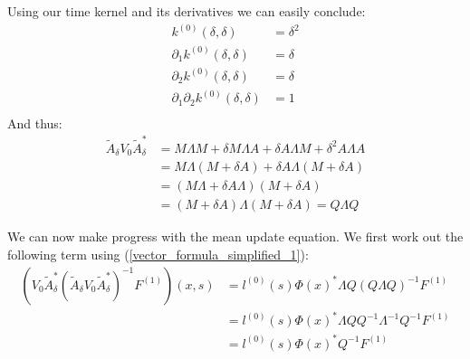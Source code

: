 \documentclass{article}
\theoremstyle{definition}
\theoremstyle{remark}
\theoremstyle{remark}
\begin{document}
\noindent Using our time kernel and its derivatives we can easily conclude:
\begin{align*}
    k^{(0)}(\delta,\delta) &= \delta^2 \\
    \partial_{1}k^{(0)}(\delta,\delta) &= \delta \\
    \partial_{2}k^{(0)}(\delta,\delta) &= \delta \\
    \partial_{1}\partial_{2}k^{(0)}(\delta,\delta) &= 1 \\
\end{align*}
And thus:
\begin{align*}
    \tilde{A}_{\delta}V_{0}\tilde{A}_{\delta}^{*} &= M\Lambda M + \delta M\Lambda A + \delta A\Lambda M +  \delta^{2}A\Lambda A \\
    &= M\Lambda(M+\delta A)+\delta A \Lambda(M+\delta A) \\
    &= (M\Lambda+\delta A \Lambda)(M+\delta A) \\
    &= (M+\delta A)\Lambda(M+\delta A) = Q\Lambda Q
\end{align*}

\noindent We can now make progress with the mean update equation. We first work out the following term using (\ref{vector_formula_simplified_1}):
\begin{align*}
    (V_{0}\tilde{A}_{\delta}^{*}(\tilde{A}_{\delta}V_{0}\tilde{A}_{\delta}^{*})^{-1}F^{(1)})(x,s) &= l^{(0)}(s)\Phi(x)^{*}\Lambda Q (Q\Lambda Q)^{-1}F^{(1)} \\
    &=l^{(0)}(s)\Phi(x)^{*}\Lambda Q Q^{-1}\Lambda^{-1}Q^{-1}F^{(1)} \\
    &=l^{(0)}(s)\Phi(x)^{*}Q^{-1}F^{(1)}
\end{align*}
\end{document}
